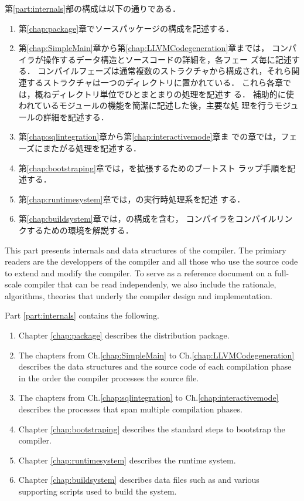 	第\ref{part:internals}部の構成は以下の通りである．
\begin{enumerate}
\item 第\ref{chap:package}章で\smlsharp{}ソースパッケージの構成を記述する．
\item 
      第\ref{chap:SimpleMain}章から第\ref{chap:LLVMCodegeneration}章までは，
\smlsharp{}コンパイラが操作するデータ構造とソースコードの詳細を，各フェー
ズ毎に記述する．
	コンパイルフェーズは通常複数のストラクチャから構成され，それら関
連するストラクチャは一つのディレクトリに置かれている．
	これら各章では，概ねディレクトリ単位でひとまとまりの処理を記述す
る． 
	補助的に使われているモジュールの機能を簡潔に記述した後，主要な処
理を行うモジュールの詳細を記述する．
\item 第\ref{chap:sqlintegration}章から第\ref{chap:interactivemode}章ま
での章では，フェーズにまたがる処理を記述する．
\item 第\ref{chap:bootstraping}章では，\smlsharp{}を拡張するためのブートスト
ラップ手順を記述する．
\item 第\ref{chap:runtimesystem}章では，\smlsharp{}の実行時処理系を記述
する．
\item 第\ref{chap:buildsystem}章では，の構成を含む，
\smlsharp{}コンパイラをコンパイルリンクするための環境を解説する．
\end{enumerate}
\else%
	This part presents internals and data structures of the
\smlsharp{} compiler.
	The primiary readers are the developpers of the \smlsharp{}
compiler and all those who use the \smlsharp{} source code to extend and
modify the compiler. 
	To serve as a reference document on a full-scale compiler that
can be read independenly, we also include the rationale, algorithms,
theories that underly the compiler design and implementation. 

	Part \ref{part:internals} contains the following.
\begin{enumerate}
\item Chapter \ref{chap:package} describes the \smlsharp{} distribution
package.
\item 
      The chapters from Ch.\ref{chap:SimpleMain} to
Ch.\ref{chap:LLVMCodegeneration} describes the data structures and the
source code of each compilation phase in the order the compiler
processes  the source file.
\item 
	The chapters from Ch.\ref{chap:sqlintegration} to
Ch.\ref{chap:interactivemode} describes the processes that span
multiple compilation phases.
\item Chapter \ref{chap:bootstraping} describes the standard steps to
bootstrap the \smlsharp{} compiler.
\item 
	Chapter \ref{chap:runtimesystem} describes the runtime system.
\item 
	Chapter \ref{chap:buildsystem} describes data files such as
 and various supporting scripts used to build the
\smlsharp{} system. 
\end{enumerate}
\fi%

